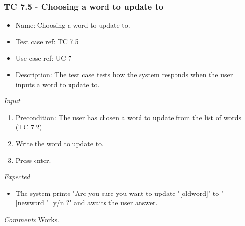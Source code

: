 \documentclass[12pt, letterpaper]{article}
\begin{document}
\subsubsection{TC 7.5 - Choosing a word to update to}
\begin{itemize}
	\item Name: Choosing a word to update to.
	\item Test case ref: TC 7.5
	\item Use case ref: UC 7
	\item Description: The test case tests how the system responds when the user inputs a word to update to.
\end{itemize}
\emph{Input}
\begin{enumerate}
	\item \underline{Precondition:} The user has chosen a word to update from the list of words (TC 7.2).
	\item Write the word to update to.
	\item Press enter.
\end{enumerate}
\emph{Expected}
\begin{itemize}
	\item The system prints "Are you sure you want to update "[oldword]" to "[newword]" [y/n]?" and awaits the user answer.
\end{itemize}
\begin{Form}
	\newline
	\newline
\end{Form}
\newline
\emph{Comments}
Works.
\end{document}
